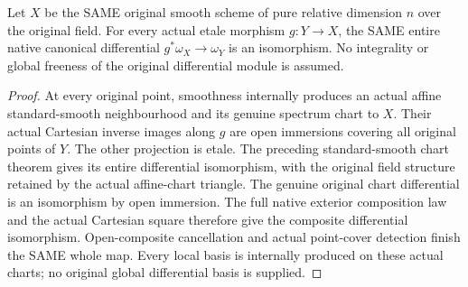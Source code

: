 \begin{theorem}
\label{thm:kn-canonical-smooth-etale}
\leanok
{}
Let $X$ be the SAME original smooth scheme of pure relative dimension $n$
over the original field. For every actual etale morphism $g:Y\to X$,
the SAME entire native canonical differential
$g^*\omega_X\to\omega_Y$ is an isomorphism. No integrality or global
freeness of the original differential module is assumed.
\end{theorem}
\begin{proof}
At every original point, smoothness internally produces an actual affine
standard-smooth neighbourhood and its genuine spectrum chart to $X$.
Their actual Cartesian inverse images along $g$ are open immersions covering
all original points of $Y$. The other projection is etale. The preceding
standard-smooth chart theorem gives its entire differential isomorphism,
with the original field structure retained by the actual affine-chart
triangle. The genuine original chart differential is an isomorphism by
open immersion. The full native exterior composition law and the actual
Cartesian square therefore give the composite differential isomorphism.
Open-composite cancellation and actual point-cover detection finish the
SAME whole map. Every local basis is internally produced on these actual
charts; no original global differential basis is supplied.
\end{proof}
